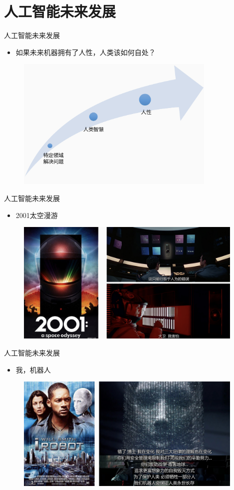 \documentclass{beamer}
\begin{document}
  \section{人工智能未来发展}

  \begin{frame}{人工智能未来发展}
    \begin{itemize}
     \item  如果未来机器拥有了人性，人类该如何自处？
    \end{itemize}
   \begin{figure}[H]
   \centering
   \includegraphics[height=2.5in]{cdjPic1.jpg}
   \end{figure}
  \end{frame}
  
   \begin{frame}{人工智能未来发展}
    \begin{itemize}
     \item 2001太空漫游
    \end{itemize}
   \begin{figure}[H]
   \centering
   \includegraphics[width=4.3in]{cdjPic2.jpg}
   \end{figure}
  \end{frame}

   \begin{frame}{人工智能未来发展}
    \begin{itemize}
     \item 我，机器人
    \end{itemize}
   \begin{figure}[H]
   \centering
   \includegraphics[width=4.3in]{cdjPic3.jpg}
   \end{figure}
  \end{frame}
\end{document}
